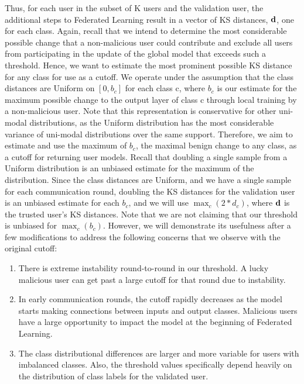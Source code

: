 \documentclass{article} %
\begin{document}
Thus, for each user in the subset of K users and the validation user, the additional steps to Federated Learning result in a vector of KS distances, ${\mathbf{d}}$, one for each class. Again, recall that we intend to determine the most considerable possible change that a non-malicious user could contribute and exclude all users from participating in the update of the global model that exceeds such a threshold. Hence, we want to estimate the most prominent possible KS distance for any class for use as a cutoff. We operate under the assumption that the class distances are Uniform on $[0, b_c]$ for each class c, where $b_c$ is our estimate for the maximum possible change to the output layer of class c through local training by a non-malicious user. Note that this representation is conservative for other uni-modal distributions, as the Uniform distribution has the most considerable variance of uni-modal distributions over the same support. Therefore, we aim to estimate and use the maximum of $b_c$, the maximal benign change to any class, as a cutoff for returning user models. Recall that doubling a single sample from a Uniform distribution is an unbiased estimate for the maximum of the distribution. Since the class distances are Uniform, and we have a single sample for each communication round, doubling the KS distances for the validation user is an unbiased estimate for each $b_c$, and we will use $\max_c (2 * d_c)$, where ${\mathbf{d}}$ is the trusted user's KS distances. Note that we are not claiming that our threshold is unbiased for $\max_c (b_c)$. However, we will demonstrate its usefulness after a few modifications to address the following concerns that we observe with the original cutoff:
\begin{enumerate}
    \item There is extreme instability round-to-round in our threshold. A lucky malicious user can get past a large cutoff for that round due to instability.
    \item In early communication rounds, the cutoff rapidly decreases as the model starts making connections between inputs and output classes. Malicious users have a large opportunity to impact the model at the beginning of Federated Learning.
    \item The class distributional differences are larger and more variable for users with imbalanced classes. Also, the threshold values specifically depend heavily on the distribution of class labels for the validated user.
\end{enumerate}
\end{document}
